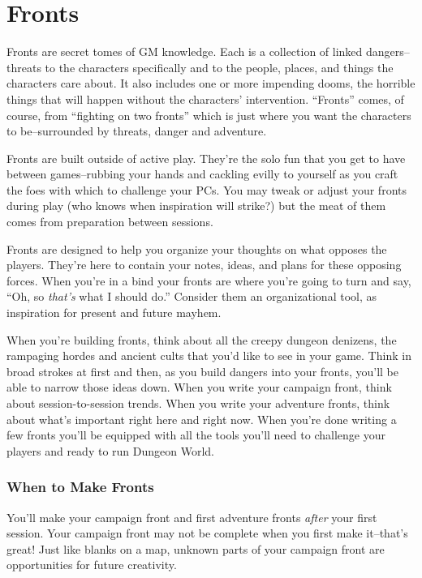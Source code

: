\chapter{Fronts}


 Fronts are secret tomes of GM knowledge. Each is a collection of linked dangers--threats to the characters specifically and to the people, places, and things the characters care about. It also includes one or more impending dooms, the horrible things that will happen without the characters' intervention. ``Fronts'' comes, of course, from ``fighting on two fronts'' which is just where you want the characters to be--surrounded by threats, danger and adventure.


 Fronts are built outside of active play. They're the solo fun that you get to have between games--rubbing your hands and cackling evilly to yourself as you craft the foes with which to challenge your PCs. You may tweak or adjust your fronts during play (who knows when inspiration will strike?) but the meat of them comes from preparation between sessions.


 Fronts are designed to help you organize your thoughts on what opposes the players. They're here to contain your notes, ideas, and plans for these opposing forces. When you're in a bind your fronts are where you're going to turn and say, ``Oh, so \emph{that's}
 what I should do.'' Consider them an organizational tool, as inspiration for present and future mayhem.


 When you're building fronts, think about all the creepy dungeon denizens, the rampaging hordes and ancient cults that you'd like to see in your game. Think in broad strokes at first and then, as you build dangers into your fronts, you'll be able to narrow those ideas down. When you write your campaign front, think about session-to-session trends. When you write your adventure fronts, think about what's important right here and right now. When you're done writing a few fronts you'll be equipped with all the tools you'll need to challenge your players and ready to run Dungeon World.
\subsection{When to Make Fronts}


 You'll make your campaign front and first adventure fronts \emph{after}
 your first session. Your campaign front may not be complete when you first make it--that's great! Just like blanks on a map, unknown parts of your campaign front are opportunities for future creativity.


